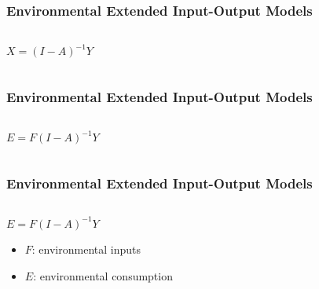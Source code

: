 \documentclass[aspectratio=169]{beamer}
\begin{document}
\begin{frame}
  \frametitle{Environmental Extended Input-Output Models}
\begin{columns}
\begin{column}{0.5\textwidth}
\begin{center}
$X = (I - A)^{-1}Y$
\end{center}
\end{column}
\begin{column}{0.5\textwidth}  %

\end{column}
\end{columns}
\end{frame}

\begin{frame}
  \frametitle{Environmental Extended Input-Output Models}
\begin{columns}
\begin{column}{0.5\textwidth}
\begin{center}
$E = F(I - A)^{-1}Y$
\end{center}
\end{column}
\begin{column}{0.5\textwidth}  %

\end{column}
\end{columns}
\end{frame}


\begin{frame}
  \frametitle{Environmental Extended Input-Output Models}
\begin{columns}
\begin{column}{0.5\textwidth}
\begin{center}
$E = F(I - A)^{-1}Y$
\\
\begin{itemize}
\item $F$: environmental inputs \pause
\item $E$: environmental consumption
\end{itemize}
\end{center}
\end{column}
\begin{column}{0.5\textwidth}  %
\end{column}
\end{columns}
\end{frame}
\end{document}
